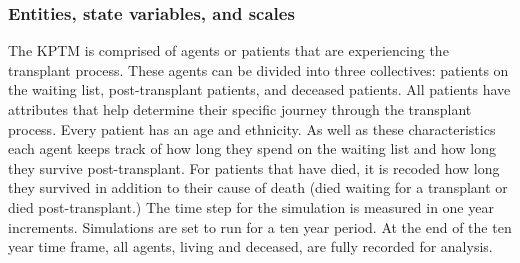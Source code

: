 \documentclass[9pt,a4paper,twocolumn]{scrartcl}
\begin{document}
\subsubsection{Entities, state variables, and scales}
The KPTM is comprised of agents or patients that are experiencing the transplant process.  These agents can be divided into three collectives: patients on the waiting list, post-transplant patients, and deceased patients.  All patients have attributes that help determine their specific journey through the transplant process.  Every patient has an age and ethnicity.  As well as these characteristics each agent keeps track of how long they spend on the waiting list and how long they survive post-transplant.  For patients that have died, it is recoded how long they survived in addition to their cause of death (died waiting for a transplant or died post-transplant.)
The time step for the simulation is measured in one year increments.  Simulations are set to run for a ten year period.  At the end of the ten year time frame, all agents, living and deceased, are fully recorded for analysis.
\end{document}
